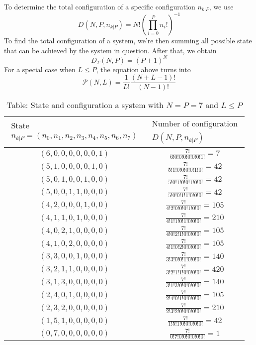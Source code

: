 \documentclass[../../../Main.tex]{subfiles}
\begin{document}
To determine the total configuration of a specific configuration $n_{k|P}$, we use
\begin{equation*}
    D(N,P,n_{k|P})= N!\left(\prod_{i=0}^{P}n_i!\right)^{-1}
\end{equation*}
To find the total configuration of a system, we're then summing all possible state that can be achieved by the system in question. After that, we obtain
\begin{equation*}
    D_T(N,P)=(P+1)^N
\end{equation*}
For a special case when $L\leq P$, the equation above turns into
\begin{equation*}
\mathcal{P}(N,L)=\frac{1}{L!}\frac{(N+L-1)!}{(N-1)!}
\end{equation*}
\begin{table}[h]
    \centering
    \caption*{Table: State and configuration a system with $N=P=7$ and $L\leq P$}
    \begin{tabular}{cc} 
        \toprule
        $\begin{array}{c}\text{State} \\n_{k|P}=(n_0,n_1,n_2, n_3, n_4, n_5, n_6, n_7)\end{array}$&$\begin{array}{c}\text{Number of configuration}\\  D(N,P,n_{k|P})\end{array}$\\
        \midrule
        $(6, 0, 0, 0, 0, 0, 0, 1)$&$\frac{7!}{6!0!0!0!0!0!0!1!} =7 $ \\
        $(5, 1, 0, 0, 0, 0, 1, 0)$&$\frac{7!}{5!1!0!0!0!0!1!0!} =42 $ \\
        $(5, 0, 1, 0, 0, 1, 0, 0)$&$\frac{7!}{5!0!1!0!0!1!0!0!} =42$\\
        $(5, 0, 0, 1, 1, 0, 0, 0)$&$\frac{7!}{5!0!0!1!1!0!0!0!} =42 $\\
        $(4, 2, 0, 0, 0, 1, 0, 0)$&$\frac{7!}{4!2!0!0!0!1!0!0!} =105$\\
        $(4, 1, 1, 0, 1, 0, 0, 0)$&$\frac{7!}{4!1!1!0!1!0!0!0!} =210 $\\
        $(4, 0, 2, 1, 0, 0, 0, 0)$&$\frac{7!}{4!0!2!1!0!0!0!0!} =105 $\\
        $(4, 1, 0, 2, 0, 0, 0, 0)$&$\frac{7!}{4!1!0!2!0!0!0!0!} =105 $\\
        $(3, 3, 0, 0, 1, 0, 0, 0)$&$\frac{7!}{3!3!0!0!1!0!0!0!} =140 $\\
        $(3, 2, 1, 1, 0, 0, 0, 0)$&$\frac{7!}{ 3!2!1!1!0!0!0!0!} =420 $\\
        $(3, 1, 3, 0, 0, 0, 0, 0)$&$\frac{7!}{3!1!3!0!0!0!0!0!} =140 $\\
        $(2, 4, 0, 1, 0, 0, 0, 0)$&$\frac{7!}{2!4!0!1!0!0!0!0!} =105 $\\
        $(2, 3, 2, 0, 0, 0, 0, 0)$&$\frac{7!}{2!3!2!0!0!0!0!0!} =210 $\\
        $(1, 5, 1, 0, 0, 0, 0, 0)$&$\frac{7!}{1!5!1!0!0!0!0!0!} =42 $\\
        $(0, 7, 0, 0, 0, 0, 0, 0)$&$\frac{7!}{0!7!0!0!0!0!0!0!} =1 $\\
        \bottomrule
    \end{tabular}
\end{table}
\end{document}
